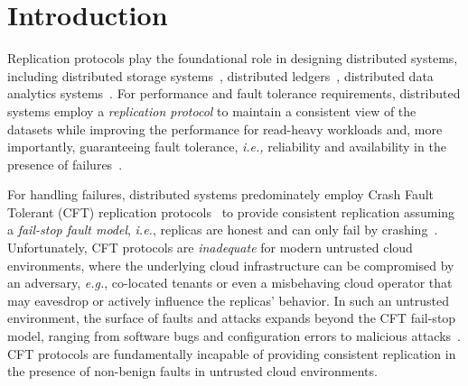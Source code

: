 \section{Introduction}
\label{sec:introduction}

Replication protocols play the foundational role in designing distributed systems, including distributed storage systems~\cite{10.14778/3007263.3007267, 10.14778/2002938.2002939, zippydb, bankDB, NetflixDB, GEDB, HESSDB}, distributed ledgers~\cite{baasAlibaba, baasAWS, baasAzure, baasIBM, baasOracle}, distributed data analytics systems~\cite{NetflixDB}.  For performance and fault tolerance requirements, distributed systems employ a {\em replication protocol} to maintain a consistent view of the datasets while improving the performance for read-heavy workloads and, more importantly, guaranteeing fault tolerance, {\em i.e.,} reliability and availability in the presence of failures~\cite{zippydb, dynamo, lakshman2009, redis, rocksdb, leveldb, memcached2004, bfthyperledger}.










For handling failures, distributed systems predominately employ Crash Fault Tolerant (CFT) replication protocols~\cite{raft,chain-replication, 10.5555/1855807.1855818, Reed2008AST, 10.5555/800253.807732, lynch:1997, 10.1145/279227.279229, Hermes:2020} to provide consistent replication assuming a {\em fail-stop fault model}, {\em i.e.}, replicas are honest and can only fail by crashing~\cite{delporte}. Unfortunately, CFT protocols are {\em inadequate} for modern untrusted cloud environments, where the underlying cloud infrastructure can be compromised by an adversary, {\em e.g.}, co-located tenants or even a misbehaving cloud operator that may eavesdrop or actively influence the replicas' behavior. In such an untrusted environment, the surface of faults and attacks expands beyond the CFT fail-stop model, ranging from software bugs and configuration errors to malicious attacks~\cite{Gunawi_bugs-in-the-cloud, Shinde2016, hahnel2017high}. CFT protocols are fundamentally incapable of providing consistent replication in the presence of non-benign faults in untrusted cloud environments.


